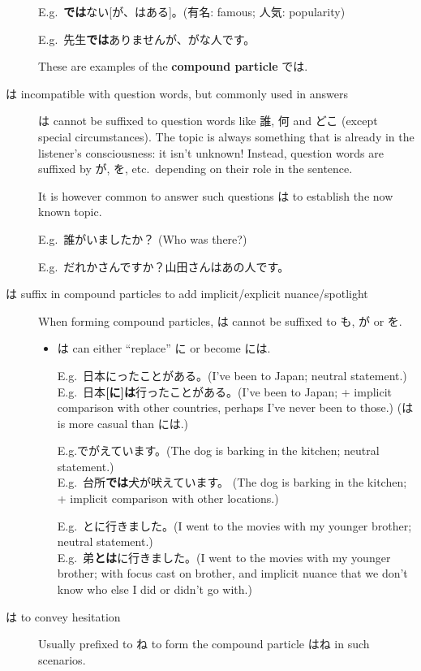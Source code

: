 \documentclass[../nihongo-gakushuu-kyouzai.tex]{subfiles}
\begin{document}
\begin{description}
    E.g.\ \textbf{では}ない[が、はある]。(有名: famous; 人気: popularity)

    E.g.\ 先生\textbf{では}ありませんが、がな人です。


    These are examples of the \textbf{compound particle} では.
    \item[は incompatible with question words, but commonly used in answers] は cannot be suffixed to question words like 誰, 何 and どこ (except special circumstances). The topic is always something that is already in the listener's consciousness: it isn't unknown! Instead, question words are suffixed by が, を, etc.\ depending on their role in the sentence.

    It is however common to answer such questions は to establish the now known topic.

    E.g.\ 誰がいましたか？ (Who was there?)

    E.g.\ だれかさんですか？山田さんはあの人です。
    \item[は suffix in compound particles to add implicit/explicit nuance/spotlight] When forming compound particles, は cannot be suffixed to も, が or を.
    \begin{itemize}
        \item は can either ``replace'' に or become には.

        E.g.\ 日本にったことがある。(I've been to Japan; neutral statement.)\\
        E.g.\ 日本\textbf{[に]は}行ったことがある。(I've been to Japan; + implicit comparison with other countries, perhaps I've never been to those.) (は is more casual than には.)

        E.g.でがえています。(The dog is barking in the kitchen; neutral statement.)\\
        E.g.\ 台所\textbf{では}犬が吠えています。 (The dog is barking in the kitchen; + implicit comparison with other locations.)

        E.g.\ とに行きました。(I went to the movies with my younger brother; neutral statement.)\\
        E.g.\ 弟\textbf{とは}に行きました。(I went to the movies with my younger brother; with focus cast on brother, and implicit nuance that we don't know who else I did or didn't go with.)
    \end{itemize}
    \item[は to convey hesitation] Usually prefixed to ね to form the compound particle はね in such scenarios.


\end{description}
\end{document}
